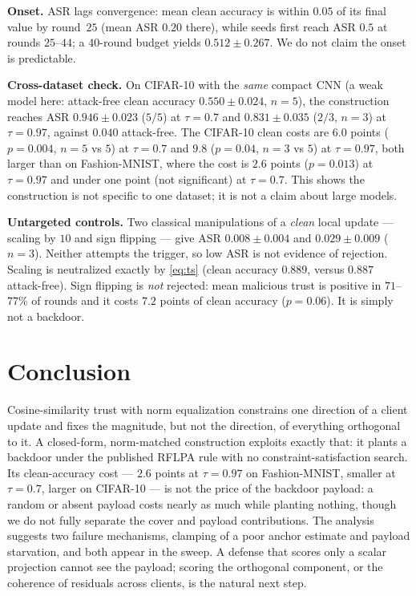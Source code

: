 \documentclass{article}
\begin{document}
\noindent\textbf{Onset.} ASR lags convergence: mean clean accuracy is within
$0.05$ of its final value by round~$25$ (mean ASR $0.20$ there), while seeds first
reach ASR $0.5$ at rounds $25$--$44$; a $40$-round budget yields $0.512\pm0.267$.
We do not claim the onset is predictable.

\noindent\textbf{Cross-dataset check.} On CIFAR-10 with the \emph{same} compact
CNN (a weak model here: attack-free clean accuracy $0.550\pm0.024$, $n{=}5$), the
construction reaches ASR $0.946\pm0.023$ ($5/5$) at $\tau=0.7$ and
$0.831\pm0.035$ ($2/3$, $n{=}3$) at $\tau=0.97$, against $0.040$ attack-free.
The CIFAR-10 clean costs are $6.0$ points ($p=0.004$, $n{=}5$ vs $5$) at $\tau=0.7$ and $9.8$ ($p=0.04$, $n{=}3$ vs $5$) at $\tau=0.97$, both larger than on Fashion-MNIST, where the cost is $2.6$ points ($p=0.013$) at $\tau=0.97$ and under one point (not significant) at $\tau=0.7$. This shows the construction is not specific to one dataset; it is not a claim about large models.

\noindent\textbf{Untargeted controls.} Two classical manipulations of a
\emph{clean} local update --- scaling by $10$ and sign flipping --- give ASR
$0.008\pm0.004$ and $0.029\pm0.009$ ($n{=}3$). Neither attempts the trigger, so
low ASR is not evidence of rejection. Scaling is neutralized exactly by
\eqref{eq:ts} (clean accuracy $0.889$, versus $0.887$ attack-free). Sign flipping
is \emph{not} rejected: mean malicious trust is positive in $71$--$77\%$ of
rounds and it costs $7.2$ points of clean accuracy ($p=0.06$). It is simply not a
backdoor.

\section{Conclusion}
\label{sec:concl}
Cosine-similarity trust with norm equalization constrains one direction of a
client update and fixes the magnitude, but not the direction, of everything
orthogonal to it. A closed-form, norm-matched construction exploits exactly that:
it plants a backdoor under the published RFLPA rule with no constraint-satisfaction
search. Its clean-accuracy cost --- $2.6$ points at $\tau=0.97$ on Fashion-MNIST, smaller at $\tau=0.7$, larger on CIFAR-10 --- is not the price of the backdoor payload: a random or absent payload costs nearly as much while planting nothing, though we do not fully separate the cover and payload contributions. The analysis suggests two failure mechanisms, clamping of a poor anchor estimate and payload starvation, and both appear in the sweep. A defense that scores only a scalar projection cannot see the payload;
scoring the orthogonal component, or the coherence of residuals across clients,
is the natural next step.
\end{document}
